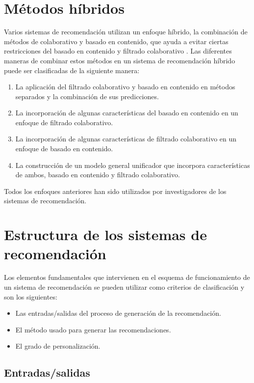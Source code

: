 \documentclass[12pt,letterpaper,oneside] {memoir}
\begin{document}
\section{Métodos híbridos}

Varios sistemas de recomendación utilizan un enfoque híbrido, la combinación de métodos de colaborativo y basado en contenido, que ayuda a evitar ciertas restricciones del basado en contenido y filtrado colaborativo \citep{Balabanovic1997, Claypool1999, Schein2002,Soboroff1999, Basu1998}. Las diferentes maneras de combinar estos métodos en un sistema de recomendación híbrido puede ser clasificadas de la siguiente manera:
\begin{enumerate}
\item La aplicación del filtrado colaborativo y basado en contenido en métodos separados y la combinación de sus predicciones.
\item La incorporación de algunas características del basado en contenido en un enfoque de filtrado colaborativo.
\item La incorporación de algunas características de filtrado colaborativo en un enfoque de basado en contenido.
\item La construcción de un modelo general unificador que incorpora características de ambos, basado en contenido y filtrado colaborativo.
\end{enumerate}

Todos los enfoques anteriores han sido utilizados por investigadores de los sistemas de recomendación.

\section{Estructura de los sistemas de recomendación}
Los elementos fundamentales que intervienen en el esquema de funcionamiento de un sistema de recomendación se pueden utilizar como criterios de clasificación \citep{Porcel2004} y son los siguientes:

\begin{itemize}
	\item Las entradas/salidas del proceso de generación de la recomendación.
	\item El método usado para generar las recomendaciones.
	\item El grado de personalización.
\end{itemize}

\subsection{Entradas/salidas}
\end{document}
